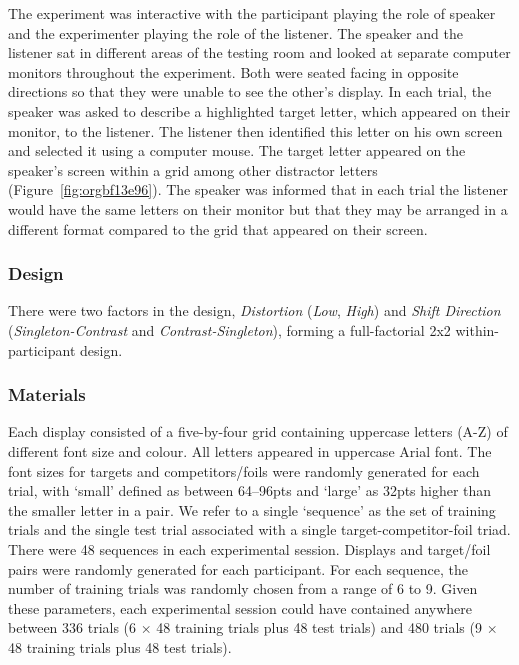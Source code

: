 \documentclass[natbib,man,a4paper]{apa6}
\begin{document}
The experiment was interactive with the participant playing the role of speaker and the experimenter playing the role of the listener. The speaker and the listener sat in different areas of the testing room and looked at separate computer monitors throughout the experiment. Both were seated facing in opposite directions so that they were unable to see the other's display. In each trial, the speaker was asked to describe a highlighted target letter, which appeared on their monitor, to the listener. The listener then identified this letter on his own screen and selected it using a computer mouse. The target letter appeared on the speaker’s screen within a grid among other distractor letters (Figure~\ref{fig:orgbf13e96}). The speaker was informed that in each trial the listener would have the same letters on their monitor but that they may be arranged in a different format compared to the grid that appeared on their screen.

\subsubsection*{Design}
\label{sec:org7493f50}

There were two factors in the design, \emph{Distortion} (\emph{Low}, \emph{High}) and \emph{Shift Direction} (\emph{Singleton-Contrast} and \emph{Contrast-Singleton}), forming a full-factorial 2x2 within-participant design.

\subsubsection*{Materials}
\label{sec:org34beec4}

Each display consisted of a five-by-four grid containing uppercase letters (A-Z) of different font size and colour. All letters appeared in uppercase Arial font. The font sizes for targets and competitors/foils were randomly generated for each trial, with `small' defined as between 64--96pts and `large' as 32pts higher than the smaller letter in a pair.  We refer to a single `sequence' as the set of training trials and the single test trial associated with a single target-competitor-foil triad. There were 48 sequences in each experimental session. Displays and target/foil pairs were randomly generated for each participant. For each sequence, the number of training trials was randomly chosen from a range of 6 to 9. Given these parameters, each experimental session could have contained anywhere between 336 trials (6 \(\times\) 48 training trials plus 48 test trials) and 480 trials (9 \(\times\) 48 training trials plus 48 test trials).  
\end{document}
